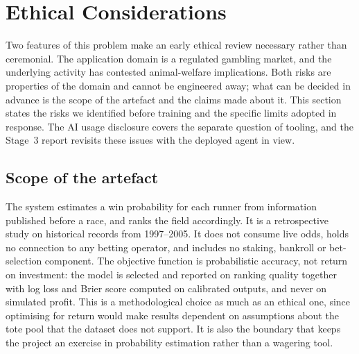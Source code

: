%
%
%
\providecommand{\PEND}[1]{\textbf{[#1]}}

\section{Ethical Considerations}
\label{sec:ethics}

Two features of this problem make an early ethical review necessary
rather than ceremonial. The application domain is a regulated gambling
market, and the underlying activity has contested animal-welfare
implications. Both risks are properties of the domain and cannot be
engineered away; what can be decided in advance is the scope of the
artefact and the claims made about it. This section states the risks we
identified before training and the specific limits adopted in response.
The AI usage disclosure covers the separate question of tooling,
and the Stage~3 report revisits these issues with the deployed agent in
view.

\subsection{Scope of the artefact}

The system estimates a win probability for each runner from information
published before a race, and ranks the field accordingly. It is a
retrospective study on historical records from 1997--2005. It does not
consume live odds, holds no connection to any betting operator, and
includes no staking, bankroll or bet-selection component. The objective
function is probabilistic accuracy, not return on investment: the model
is selected and reported on ranking quality together with log loss and
Brier score computed on calibrated outputs, and never on simulated
profit. This is a methodological
choice as much as an ethical one, since optimising for return would make
results dependent on assumptions about the tote pool that the dataset does
not support. It is also the boundary that keeps the project an exercise in
probability estimation rather than a wagering tool.

